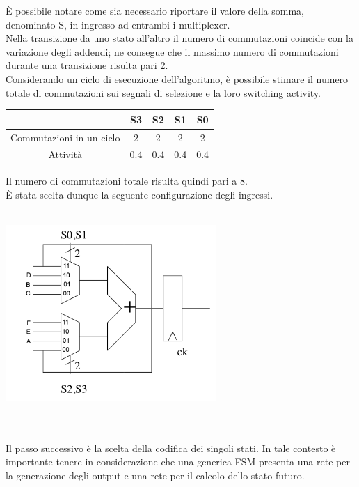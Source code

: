 \documentclass[11pt,  english, makeidx, a4paper, titlepage, oneside]{book}
\begin{document}
\vspace{0.3cm}     
È possibile notare come sia necessario riportare il valore della somma, denominato S, in ingresso ad entrambi i multiplexer.
\\
Nella transizione da uno stato all'altro il numero di commutazioni coincide con la variazione degli addendi; ne consegue che il massimo numero di commutazioni durante una transizione risulta pari 2.\\
Considerando un ciclo di esecuzione dell'algoritmo, è possibile stimare il numero totale di commutazioni sui segnali di selezione e la loro switching activity.\\
\begin{center}
	\begin{tabular}{|c|c|c|c|c|}
	\hline
	 & S3 & S2 & S1 & S0 \\ 
	\hline
	Commutazioni in un ciclo & 2 & 2 & 2 & 2 \\
	\hline
	Attività & 0.4 & 0.4 & 0.4 & 0.4  \\
	\hline
	\end{tabular}	
\end{center}
\vspace{0.3cm}  
Il numero di commutazioni totale risulta quindi pari a 8.\\
È stata scelta dunque la seguente configurazione degli ingressi.
\\\\
\centerline{\includegraphics[width=8cm]{./img/Lab_2/Datapath_input.png}}
\\\\  
Il passo successivo è la scelta della codifica dei singoli stati. In tale contesto è importante tenere in considerazione che una generica FSM presenta una rete per la generazione degli output e una rete per il calcolo dello stato futuro. 
\\\\
\end{document}
